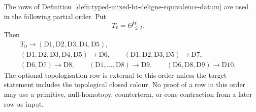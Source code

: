 \begin{lem}
\label{lem:typed-deligne-dependency-dag}
The rows of Definition~\ref{defn:typed-mixed-ht-deligne-equivalence-datum}
are used in the following partial order.  Put
\[
  T_0=\Theta^{\mathrm{tr}}_{\leq2}.
\]
Then
\[
\begin{gathered}
  T_0
  \longrightarrow
  (\mathrm{D1},\mathrm{D2},\mathrm{D3},\mathrm{D4},\mathrm{D5}),\\
  (\mathrm{D1},\mathrm{D2},\mathrm{D3},\mathrm{D4},\mathrm{D5})
  \longrightarrow \mathrm{D6},\qquad
  (\mathrm{D1},\mathrm{D2},\mathrm{D3},\mathrm{D5})
  \longrightarrow \mathrm{D7},\\
  (\mathrm{D6},\mathrm{D7})\longrightarrow\mathrm{D8},\qquad
  (\mathrm{D1},\ldots,\mathrm{D8})\longrightarrow\mathrm{D9},\qquad
  (\mathrm{D6},\mathrm{D8},\mathrm{D9})\longrightarrow\mathrm{D10}.
\end{gathered}
\]
The optional topologisation row is external to this order unless the
target statement includes the topological closed colour.  No proof of a
row in this order may use a primitive, null-homotopy, counterterm, or
cone contraction from a later row as input.
\end{lem}

